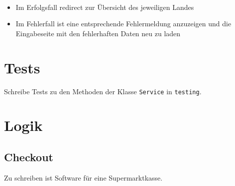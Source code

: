 \begin{itemize}
\begin{itemize}
		\\
		\begin{itemize}
			\item Im Erfolgsfall redirect zur Übersicht des jeweiligen Landes
			\item Im Fehlerfall ist eine entsprechende Fehlermeldung anzuzeigen und die Eingabeseite mit den fehlerhaften Daten neu zu laden
		\end{itemize}
	\end{itemize}
\end{itemize}

\section{Tests}
Schreibe Tests zu den Methoden der Klasse \texttt{Service} in \texttt{testing}.

\section{Logik}
\subsection{Checkout}
Zu schreiben ist Software für eine Supermarktkasse.

